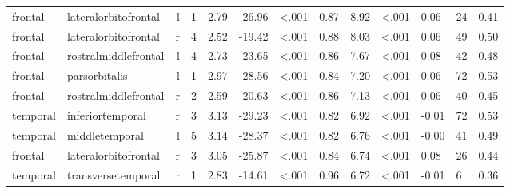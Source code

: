 \documentclass{article}
\begin{document}
\begin{longtable}{llrR{1.3cm}R{1cm}R{1.3cm}R{1cm}R{1cm}R{1.3cm}R{1cm}R{1.8cm}R{1.3cm}R{1.8cm}}
\bottomrule
\endlastfoot
   frontal &      lateralorbitofrontal &    l &         1 &                  2.79 &           -26.96 &      \textless.001 &                               0.87 &                          8.92 &                   \textless.001 &   0.06 &     24 &      0.41 \\
   frontal &      lateralorbitofrontal &    r &         4 &                  2.52 &           -19.42 &      \textless.001 &                               0.88 &                          8.03 &                   \textless.001 &   0.06 &     49 &      0.50 \\
   frontal &      rostralmiddlefrontal &    l &         4 &                  2.73 &           -23.65 &      \textless.001 &                               0.86 &                          7.67 &                   \textless.001 &   0.08 &     42 &      0.48 \\
   frontal &             parsorbitalis &    l &         1 &                  2.97 &           -28.56 &      \textless.001 &                               0.84 &                          7.20 &                   \textless.001 &   0.06 &     72 &      0.53 \\
   frontal &      rostralmiddlefrontal &    r &         2 &                  2.59 &           -20.63 &      \textless.001 &                               0.86 &                          7.13 &                   \textless.001 &   0.06 &     40 &      0.45 \\
  temporal &          inferiortemporal &    r &         3 &                  3.13 &           -29.23 &      \textless.001 &                               0.82 &                          6.92 &                   \textless.001 &  -0.01 &     72 &      0.53 \\
  temporal &            middletemporal &    l &         5 &                  3.14 &           -28.37 &      \textless.001 &                               0.82 &                          6.76 &                   \textless.001 &  -0.00 &     41 &      0.49 \\
   frontal &      lateralorbitofrontal &    r &         3 &                  3.05 &           -25.87 &      \textless.001 &                               0.84 &                          6.74 &                   \textless.001 &   0.08 &     26 &      0.44 \\
  temporal &        transversetemporal &    r &         1 &                  2.83 &           -14.61 &      \textless.001 &                               0.96 &                          6.72 &                   \textless.001 &  -0.01 &      6 &      0.36 \\

\end{longtable}
\end{document}
